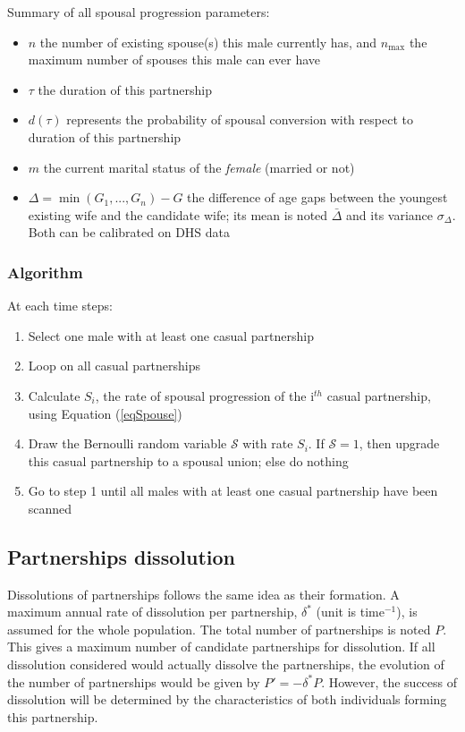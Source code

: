 \documentclass[11pt, onecolumn]{article}
\begin{document}
Summary of all spousal progression parameters:
\begin{itemize}
\item $n$ the number of existing spouse(s) this male currently has, and $n_{\mathrm{max}}$ the maximum number of spouses this male can ever have
\item $\tau$ the duration of this partnership
\item $d(\tau)$ represents the probability of spousal conversion with respect to duration of this partnership
\item $m$ the current marital status of the \emph{female} (married or not)
\item $\Delta = \min(G_1,...,G_n)-G$ the difference of age gaps between the youngest existing wife and the candidate wife; its mean is noted $\bar{\Delta}$ and its variance $\sigma_\Delta$. Both can be calibrated on DHS data
\end{itemize}

\subsubsection{Algorithm}

At each time steps:
\begin{enumerate} 
\item Select one male with at least one casual partnership
\item Loop on all casual partnerships
\item Calculate $S_i$, the rate of spousal progression of the i$^{th}$ casual partnership, using Equation (\ref{eqSpouse})
\item Draw the Bernoulli random variable $\mathcal{S}$ with rate $S_i$. If $\mathcal{S}=1$, then upgrade this casual partnership to a spousal union; else do nothing
\item Go to step 1 until all males with at least one casual partnership have been scanned
\end{enumerate}



\subsection{Partnerships dissolution}

Dissolutions of partnerships follows the same idea as their formation. A maximum annual rate of dissolution per partnership, $\delta^*$ (unit is time$^{-1}$), is assumed for the whole population. The total number of partnerships is noted $P$. This gives a maximum number of candidate partnerships for dissolution. 
If all dissolution considered would actually dissolve the partnerships, the evolution of the number of partnerships would be given by $P'=-\delta^*P$.
However, the success of dissolution will be determined by the characteristics of both individuals forming this partnership.
\end{document}
